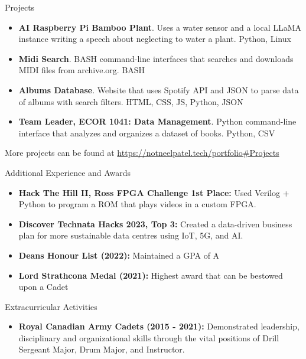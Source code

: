 \documentclass[]{mcdowellcv}
\begin{document}
	\begin{cvsection}{Projects}
		\begin{cvsubsection}{}{}{}
			\begin{itemize}
				\item \textbf{AI Raspberry Pi Bamboo Plant}. Uses a water sensor and a local LLaMA instance writing a speech about neglecting to water a plant. Python, Linux
				\item \textbf{Midi Search}. BASH command-line interfaces that searches and downloads MIDI files from archive.org. BASH
				\item \textbf{Albums Database}. Website that uses Spotify API and JSON to parse data of albums with search filters. HTML, CSS, JS, Python, JSON
				\item \textbf{Team Leader, ECOR 1041: Data Management}. Python command-line interface that analyzes and organizes a dataset of books. Python, CSV
			\end{itemize}
				More projects can be found at \url{https://notneelpatel.tech/portfolio#Projects}
		\end{cvsubsection}
	\end{cvsection}
	
	\begin{cvsection}{Additional Experience and Awards}
		\begin{cvsubsection}{}{}{}	
			\begin{itemize}
				\item \textbf{Hack The Hill II, Ross FPGA Challenge 1st Place:} Used Verilog + Python to program a ROM that plays videos in a custom FPGA. 
				\item \textbf{Discover Technata Hacks 2023, Top 3:} Created a data-driven business plan for more sustainable data centres using IoT, 5G, and AI.  
				\item \textbf{Deans Honour List (2022):} Maintained a GPA of A
				\item \textbf{Lord Strathcona Medal (2021):} Highest award that can be bestowed upon a Cadet
			\end{itemize}
		\end{cvsubsection}
	\end{cvsection}
	
	\begin{cvsection}{Extracurricular Activities}
		\begin{cvsubsection}{}{}{}
			\begin{itemize}
				\item \textbf{Royal Canadian Army Cadets (2015 - 2021):} Demonstrated leadership, disciplinary and organizational skills through the vital positions of Drill Sergeant Major, Drum Major, and Instructor.
			\end{itemize}
		\end{cvsubsection}
	\end{cvsection}
\end{document}
